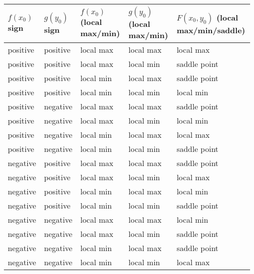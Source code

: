 \documentclass[10pt]{amsart}
\begin{document}
\begin{tabular}{|l|l|l|l|l|}
  \hline
  $f(x_0)$ sign & $g(y_0)$ sign & $f(x_0)$ (local max/min) & $g(y_0)$ (local max/min) & $F(x_0,y_0)$ (local max/min/saddle)\\
  \hline
  positive & positive & local max & local max & local max\\
  \hline
  positive & positive & local max & local min & saddle point \\
  \hline
  positive & positive & local min & local max & saddle point \\
  \hline
  positive & positive & local min & local min & local min \\
  \hline
  positive & negative & local max & local max & saddle point\\
  \hline
  positive & negative & local max & local min & local min\\
  \hline
  positive & negative & local min & local max & local max\\
  \hline
  positive & negative & local min & local min & saddle point\\
  \hline
  negative & positive & local max & local max & saddle point\\
  \hline
  negative & positive & local max & local min & local max \\
  \hline
  negative & positive & local min & local max & local min \\
  \hline
  negative & positive & local min & local min & saddle point \\
  \hline
  negative & negative & local max & local max & local min \\
  \hline
  negative & negative & local max & local min & saddle point \\
  \hline
  negative & negative & local min & local max & saddle point \\
  \hline
  negative & negative & local min & local min & local max \\
  \hline
\end{tabular}
\end{document}
